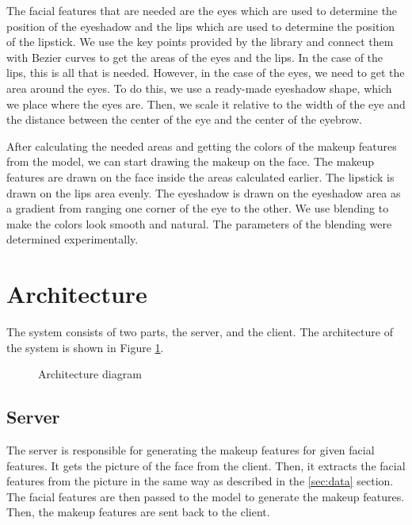 \documentclass[conference]{IEEEtran}
\begin{document}
The facial features that are needed are the eyes which are used to determine the position of the eyeshadow and the lips which are used to determine the position of the lipstick.
We use the key points provided by the library and connect them with Bezier curves to get the areas of the eyes and the lips.
In the case of the lips, this is all that is needed.
However, in the case of the eyes, we need to get the area around the eyes.
To do this, we use a ready-made eyeshadow shape, which we place where the eyes are.
Then, we scale it relative to the width of the eye and the distance between the center of the eye and the center of the eyebrow.

After calculating the needed areas and getting the colors of the makeup features from the model, we can start drawing the makeup on the face.
The makeup features are drawn on the face inside the areas calculated earlier.
The lipstick is drawn on the lips area evenly.
The eyeshadow is drawn on the eyeshadow area as a gradient from ranging one corner of the eye to the other.
We use blending to make the colors look smooth and natural.
The parameters of the blending were determined experimentally.

\section{Architecture} \label{sec:architecture}

The system consists of two parts, the server, and the client.
The architecture of the system is shown in Figure \ref{fig:architecture}.

\begin{figure}
    \centering 
    \vspace{2mm}
    \caption{Architecture diagram}
    \label{fig:architecture}
\end{figure}

\subsection{Server}

The server is responsible for generating the makeup features for given facial features.
It gets the picture of the face from the client.
Then, it extracts the facial features from the picture in the same way as described in the \ref{sec:data} section.
The facial features are then passed to the model to generate the makeup features.
Then, the makeup features are sent back to the client.
\end{document}
